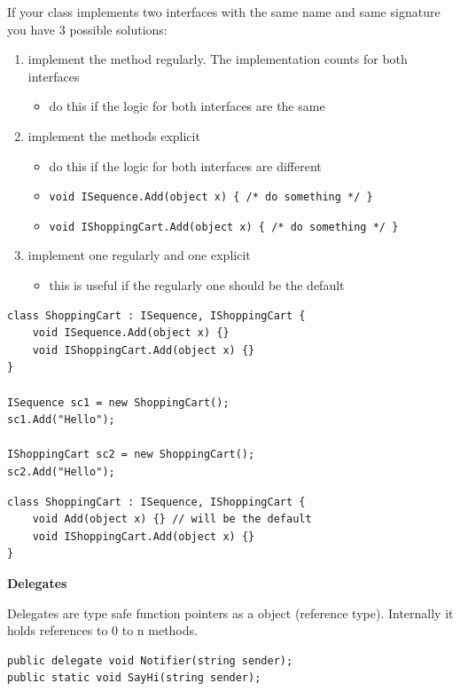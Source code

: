 \documentclass[11pt,twoside,landscape]{article}
\begin{document}
\begin{multicols}{3}
If your class implements two interfaces with the same name and same signature you have 3 possible solutions:
\begin{enumerate}
\item implement the method regularly.
The implementation counts for both interfaces
\begin{itemize}
\item do this if the logic for both interfaces are the same
\end{itemize}
\item implement the methods explicit
\begin{itemize}
\item do this if the logic for both interfaces are different
\item \texttt{void ISequence.Add(object x) \{ /* do something */ \}}
\item \texttt{void IShoppingCart.Add(object x) \{ /* do something */ \}}
\end{itemize}
\item implement one regularly and one explicit
\begin{itemize}
\item this is useful if the regularly one should be the default
\end{itemize}
\end{enumerate}

\lstset{language=csharp,label= ,caption= ,captionpos=b,numbers=none}
\begin{lstlisting}
class ShoppingCart : ISequence, IShoppingCart {
    void ISequence.Add(object x) {}
    void IShoppingCart.Add(object x) {}
}

ISequence sc1 = new ShoppingCart();
sc1.Add("Hello");

IShoppingCart sc2 = new ShoppingCart();
sc2.Add("Hello");
\end{lstlisting}

\lstset{language=csharp,label= ,caption= ,captionpos=b,numbers=none}
\begin{lstlisting}
class ShoppingCart : ISequence, IShoppingCart {
    void Add(object x) {} // will be the default
    void IShoppingCart.Add(object x) {}
}
\end{lstlisting}

\textbf{Delegates}

Delegates are type safe function pointers as a object (reference type).
Internally it holds references to 0 to n methods.

\lstset{language=csharp,label= ,caption= ,captionpos=b,numbers=none}
\begin{lstlisting}
public delegate void Notifier(string sender);
public static void SayHi(string sender);



\end{lstlisting}
\end{multicols}
\end{document}
